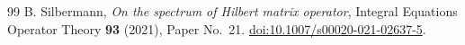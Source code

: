 \documentclass[11pt,a4paper,reqno]{amsart}
\theoremstyle{remark}
\begin{document}
\begin{thebibliography}{99}
B. Silbermann,
\emph{On the spectrum of Hilbert matrix operator},
Integral Equations Operator Theory \textbf{93} (2021), Paper No.~21.
\href{https://doi.org/10.1007/s00020-021-02637-5}{doi:10.1007/s00020-021-02637-5}.


\end{thebibliography}
\end{document}
